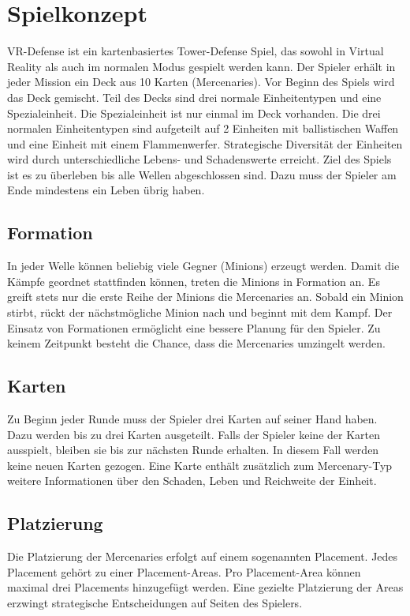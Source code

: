 \chapter{Spielkonzept}
VR-Defense ist ein kartenbasiertes Tower-Defense Spiel, das sowohl in Virtual Reality als auch im normalen Modus gespielt werden kann. 
Der Spieler erhält in jeder Mission ein Deck aus 10 Karten (Mercenaries). 
Vor Beginn des Spiels wird das Deck gemischt. 
Teil des Decks sind drei normale Einheitentypen und eine Spezialeinheit.
Die Spezialeinheit ist nur einmal im Deck vorhanden.
Die drei normalen Einheitentypen sind aufgeteilt auf 2 Einheiten mit ballistischen Waffen und eine Einheit mit einem Flammenwerfer. 
Strategische Diversität der Einheiten wird durch unterschiedliche Lebens- und Schadenswerte erreicht.
Ziel des Spiels ist es zu überleben bis alle Wellen abgeschlossen sind. 
Dazu muss der Spieler am Ende mindestens ein Leben übrig haben.

\section{Formation}
In jeder Welle können beliebig viele Gegner (Minions) erzeugt werden. 
Damit die Kämpfe geordnet stattfinden können, treten die Minions in Formation an.
Es greift stets nur die erste Reihe der Minions die Mercenaries an. 
Sobald ein Minion stirbt, rückt der nächstmögliche Minion nach und beginnt mit dem Kampf.
Der Einsatz von Formationen ermöglicht eine bessere Planung für den Spieler. 
Zu keinem Zeitpunkt besteht die Chance, dass die Mercenaries umzingelt werden.

\section{Karten}
Zu Beginn jeder Runde muss der Spieler drei Karten auf seiner Hand haben. 
Dazu werden bis zu drei Karten ausgeteilt.
Falls der Spieler keine der Karten ausspielt, bleiben sie bis zur nächsten Runde erhalten.
In diesem Fall werden keine neuen Karten gezogen.
Eine Karte enthält zusätzlich zum Mercenary-Typ weitere Informationen über den Schaden, Leben und Reichweite der Einheit.

\section{Platzierung}
Die Platzierung der Mercenaries erfolgt auf einem sogenannten Placement. 
Jedes Placement gehört zu einer Placement-Areas. 
Pro Placement-Area können maximal drei Placements hinzugefügt werden.
Eine gezielte Platzierung der Areas erzwingt strategische Entscheidungen auf Seiten des Spielers.

